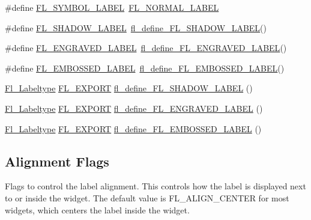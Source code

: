 \begin{DoxyCompactItemize}
\item 
\#define \hyperlink{_enumerations_8_h_a0f3c67869158635bd9bfe3f97a87fc0e}{F\+L\+\_\+\+S\+Y\+M\+B\+O\+L\+\_\+\+L\+A\+B\+EL}~\hyperlink{_enumerations_8_h_ad5774781d33328b82990ff9e25dfd61ba81ddb843b9f43f73446ea7d6d7d8cc84}{F\+L\+\_\+\+N\+O\+R\+M\+A\+L\+\_\+\+L\+A\+B\+EL}
\item 
\#define \hyperlink{_enumerations_8_h_ab44620a0effd74a4ace6244e6e6bb2ee}{F\+L\+\_\+\+S\+H\+A\+D\+O\+W\+\_\+\+L\+A\+B\+EL}~\hyperlink{_enumerations_8_h_acceca4e5fa60fae68ee0098bd9f44124}{fl\+\_\+define\+\_\+\+F\+L\+\_\+\+S\+H\+A\+D\+O\+W\+\_\+\+L\+A\+B\+EL}()
\item 
\#define \hyperlink{_enumerations_8_h_a2f03450b19c29126ec202b3505023b7b}{F\+L\+\_\+\+E\+N\+G\+R\+A\+V\+E\+D\+\_\+\+L\+A\+B\+EL}~\hyperlink{_enumerations_8_h_ad2356471e464dcdc818929365be0781e}{fl\+\_\+define\+\_\+\+F\+L\+\_\+\+E\+N\+G\+R\+A\+V\+E\+D\+\_\+\+L\+A\+B\+EL}()
\item 
\#define \hyperlink{_enumerations_8_h_aa8215ff52c3386f676ac92d55bf57c18}{F\+L\+\_\+\+E\+M\+B\+O\+S\+S\+E\+D\+\_\+\+L\+A\+B\+EL}~\hyperlink{_enumerations_8_h_a323a068ca36b789472bfb8e50e155b93}{fl\+\_\+define\+\_\+\+F\+L\+\_\+\+E\+M\+B\+O\+S\+S\+E\+D\+\_\+\+L\+A\+B\+EL}()
\item 
\hyperlink{_enumerations_8_h_ad5774781d33328b82990ff9e25dfd61b}{Fl\+\_\+\+Labeltype} \hyperlink{_fl___export_8_h_aa9ba29a18aee9d738370a06eeb4470fc}{F\+L\+\_\+\+E\+X\+P\+O\+RT} \hyperlink{_enumerations_8_h_acceca4e5fa60fae68ee0098bd9f44124}{fl\+\_\+define\+\_\+\+F\+L\+\_\+\+S\+H\+A\+D\+O\+W\+\_\+\+L\+A\+B\+EL} ()
\item 
\hyperlink{_enumerations_8_h_ad5774781d33328b82990ff9e25dfd61b}{Fl\+\_\+\+Labeltype} \hyperlink{_fl___export_8_h_aa9ba29a18aee9d738370a06eeb4470fc}{F\+L\+\_\+\+E\+X\+P\+O\+RT} \hyperlink{_enumerations_8_h_ad2356471e464dcdc818929365be0781e}{fl\+\_\+define\+\_\+\+F\+L\+\_\+\+E\+N\+G\+R\+A\+V\+E\+D\+\_\+\+L\+A\+B\+EL} ()
\item 
\hyperlink{_enumerations_8_h_ad5774781d33328b82990ff9e25dfd61b}{Fl\+\_\+\+Labeltype} \hyperlink{_fl___export_8_h_aa9ba29a18aee9d738370a06eeb4470fc}{F\+L\+\_\+\+E\+X\+P\+O\+RT} \hyperlink{_enumerations_8_h_a323a068ca36b789472bfb8e50e155b93}{fl\+\_\+define\+\_\+\+F\+L\+\_\+\+E\+M\+B\+O\+S\+S\+E\+D\+\_\+\+L\+A\+B\+EL} ()
\end{DoxyCompactItemize}
\subsection*{Alignment Flags}
\label{_amgrpd9d225b55647fd693b298abca33f4418}%
Flags to control the label alignment. This controls how the label is displayed next to or inside the widget. The default value is F\+L\+\_\+\+A\+L\+I\+G\+N\+\_\+\+C\+E\+N\+T\+ER for most widgets, which centers the label inside the widget.

